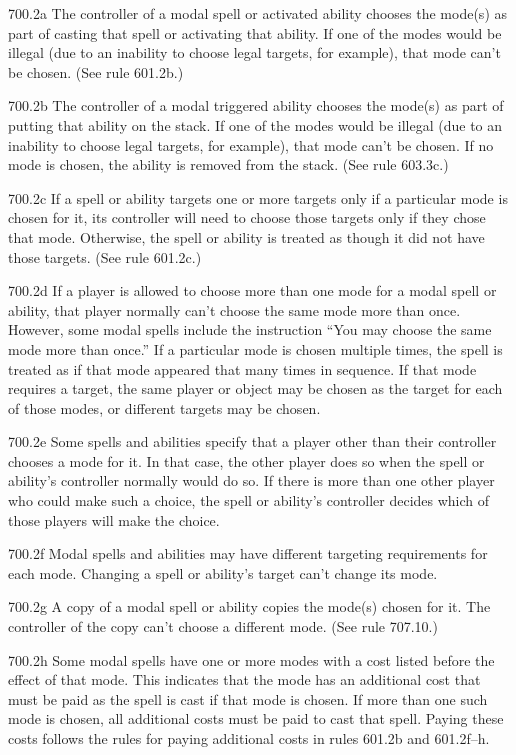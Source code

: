 700.2a The controller of a modal spell or activated ability chooses the mode(s) as part of casting that spell or activating that ability. If one of the modes would be illegal (due to an inability to choose legal targets, for example), that mode can’t be chosen. (See rule 601.2b.)

700.2b The controller of a modal triggered ability chooses the mode(s) as part of putting that ability on the stack. If one of the modes would be illegal (due to an inability to choose legal targets, for example), that mode can’t be chosen. If no mode is chosen, the ability is removed from the stack. (See rule 603.3c.)

700.2c If a spell or ability targets one or more targets only if a particular mode is chosen for it, its controller will need to choose those targets only if they chose that mode. Otherwise, the spell or ability is treated as though it did not have those targets. (See rule 601.2c.)

700.2d If a player is allowed to choose more than one mode for a modal spell or ability, that player normally can’t choose the same mode more than once. However, some modal spells include the instruction “You may choose the same mode more than once.” If a particular mode is chosen multiple times, the spell is treated as if that mode appeared that many times in sequence. If that mode requires a target, the same player or object may be chosen as the target for each of those modes, or different targets may be chosen.

700.2e Some spells and abilities specify that a player other than their controller chooses a mode for it. In that case, the other player does so when the spell or ability’s controller normally would do so. If there is more than one other player who could make such a choice, the spell or ability’s controller decides which of those players will make the choice.

700.2f Modal spells and abilities may have different targeting requirements for each mode. Changing a spell or ability’s target can’t change its mode.

700.2g A copy of a modal spell or ability copies the mode(s) chosen for it. The controller of the copy can’t choose a different mode. (See rule 707.10.)

700.2h Some modal spells have one or more modes with a cost listed before the effect of that mode. This indicates that the mode has an additional cost that must be paid as the spell is cast if that mode is chosen. If more than one such mode is chosen, all additional costs must be paid to cast that spell. Paying these costs follows the rules for paying additional costs in rules 601.2b and 601.2f–h.

